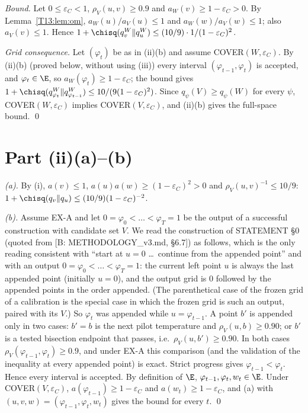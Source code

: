 \documentclass[11pt]{report}
\begin{document}
\emph{Bound.} Let $0\le\varepsilon_C<1$, $\rho_V(u,v)\ge 0.9$ and $a_W(v)\ge1-\varepsilon_C>0$. By Lemma~\ref{T13:lem:om}, $a_W(u)/a_V(u)\le1$ and $a_W(w)/a_V(w)\le1$; also $a_V(v)\le1$. Hence
$1+\chisq(q_v^W\|q_u^W)\le (10/9)\cdot 1/(1-\varepsilon_C)^2$.

\emph{Grid consequence.} Let $(\varphi_t)$ be as in (ii)(b) and assume COVER$(W,\varepsilon_C)$. By (ii)(b) (proved below, without using (iii)) every interval $(\varphi_{t-1},\varphi_t)$ is accepted, and $\varphi_t\in\E$, so $a_W(\varphi_t)\ge1-\varepsilon_C$; the bound gives $1+\chisq(q^W_{\varphi_t}\|q^W_{\varphi_{t-1}})\le 10/(9(1-\varepsilon_C)^2)$. Since $q_\psi(V)\ge q_\psi(W)$ for every $\psi$, COVER$(W,\varepsilon_C)$ implies COVER$(V,\varepsilon_C)$, and (ii)(b) gives the full-space bound. \qed

\section{Part (ii)(a)--(b)}
\emph{(a).} By (i), $a(v)\le1$, $a(u)a(w)\ge(1-\varepsilon_C)^2>0$ and $\rho_V(u,v)^{-1}\le 10/9$:
$1+\chisq(q_v\|q_u)\le (10/9)(1-\varepsilon_C)^{-2}$.

\emph{(b).} Assume EX-A and let $0=\varphi_0<\dots<\varphi_T=1$ be the output of a successful construction with candidate set $V$. We read the construction of STATEMENT \S0 (quoted from [B: METHODOLOGY\_v3.md, \S6.7]) as follows, which is the only reading consistent with ``start at $u=0$ \dots\ continue from the appended point'' and with an output $0=\varphi_0<\dots<\varphi_T=1$: the current left point $u$ is always the last appended point (initially $u=0$), and the output grid is $0$ followed by the appended points in the order appended. (The parenthetical case of the frozen grid of a calibration is the special case in which the frozen grid is such an output, paired with its $V$.) So $\varphi_t$ was appended while $u=\varphi_{t-1}$. A point $b'$ is appended only in two cases: $b'=b$ is the next pilot temperature and $\rho_V(u,b)\ge0.90$; or $b'$ is a tested bisection endpoint that passes, i.e.\ $\rho_V(u,b')\ge0.90$. In both cases $\rho_V(\varphi_{t-1},\varphi_t)\ge 0.9$, and under EX-A this comparison (and the validation of the inequality at every appended point) is exact. Strict progress gives $\varphi_{t-1}<\varphi_t$. Hence every interval is accepted. By definition of $\E$, $\varphi_{t-1},\varphi_t,w_t\in\E$. Under COVER$(V,\varepsilon_C)$, $a(\varphi_{t-1})\ge1-\varepsilon_C$ and $a(w_t)\ge1-\varepsilon_C$, and (a) with $(u,v,w)=(\varphi_{t-1},\varphi_t,w_t)$ gives the bound for every $t$. \qed
\end{document}
